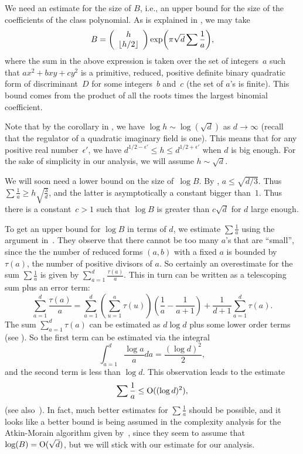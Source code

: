 \documentclass{amsart}
\newcommand{\ra}{\rightarrow}
\newcommand{\bigo}{{\rm O}}
\theoremstyle{plain}
\begin{document}
We need an estimate for the size of $B$, i.e., an 
upper bound for the size of the coefficients of the class polynomial.
As is explained in \cite[p.~42]{atmor}, we may take 
\begin{eqnarray} \label{Bformula}
B = \left(
  \begin{array}{c}
  h \\
  \lfloor h/2 \rfloor 
  \end{array} \right) 
{\rm exp}\bigg({\pi \sqrt{d}} \sum \frac{1}{a} \bigg),
\end{eqnarray}
where the sum in the above expression is taken over the set of integers~$a$
such that $ax^2 + bxy +cy^2$ is a primitive, reduced, positive definite 
binary quadratic form of discriminant~$D$ for some integers~$b$ and~$c$
(the set of $a$'s is finite).  
This bound comes from the product of all the roots times the largest 
binomial coefficient.  

Note that by the corollary in \cite[Chap XVI, \S4]{langant},
we have $\log h \sim \log(\sqrt{d})$ as $d \ra \infty$
(recall that the regulator of a quadratic imaginary field is one).
This means that for any positive real number~$\epsilon'$, we have
$d^{1/2-\epsilon'} \leq h \leq d^{1/2+\epsilon'}$
when $d$ is big enough. For the sake of simplicity 
in our analysis, we will assume $h \sim \sqrt{d}$.

We will soon need a lower bound on the size of~$\log B$.
By \cite[Lem.~5.3.4(1)]{cohen}, $a \leq \sqrt{d/3}$.
Thus $\sum \frac{1}{a} \geq h \sqrt{\frac{3}{d}}$, and
the latter is asymptotically a constant bigger than~$1$.
Thus there is a constant~$c>1$ such that $\log B$ 
is greater than $c \sqrt{d}$
for $d$ large enough.

To get an upper bound for $\log B$ in terms of $d$, we
estimate  $\sum \frac{1}{a}$ 
using the argument in~\cite[p.~711]{ll}. They observe that
there cannot be too many $a$'s  that are ``small'', since the 
the number of reduced forms $(a,b)$ with a fixed $a$ is bounded 
by $\tau(a)$, the number of positive divisors of $a$. 
So certainly an overestimate for the sum $\sum \frac{1}{a}$ 
is given by $\sum_{a=1}^d \frac{\tau(a)}{a}$.  This in turn can
be written as a telescoping sum plus an error term:
$$\sum_{a=1}^d \frac{\tau(a)}{a} = 
\sum_{a=1}^d (\sum_{u=1}^a \tau(u))(\frac{1}{a}-\frac{1}{a+1}) +
\frac{1}{d+1}\sum_{a=1}^d \tau(a).$$
The sum $\sum_{a=1}^d \tau(a)$ can be estimated as $d\log d$ plus some lower order terms
(see \cite[Thm 8.28, p. 393]{nzm}).  
So the first term can be estimated via the integral
$$\int_{a=1}^d \frac{\log a}{a} da = \frac{(\log d)^2}{2},$$
and the second term is less than $\log d$.
This observation leads to the estimate $$ \sum \frac{1}{a} \le \bigo ((\log d)^2),$$
(see also~\cite[p.~324]{crandall-pomerance}). 
In fact, much better estimates for $\sum \frac{1}{a}$ should be possible,
and it looks like a better bound is being assumed in
the complexity analysis for the Atkin-Morain algorithm given
by~\cite{ll}, since they seem to assume that $\log(B) = \bigo (\sqrt{d})$, but we will
stick with our estimate for our analysis.
\end{document}
